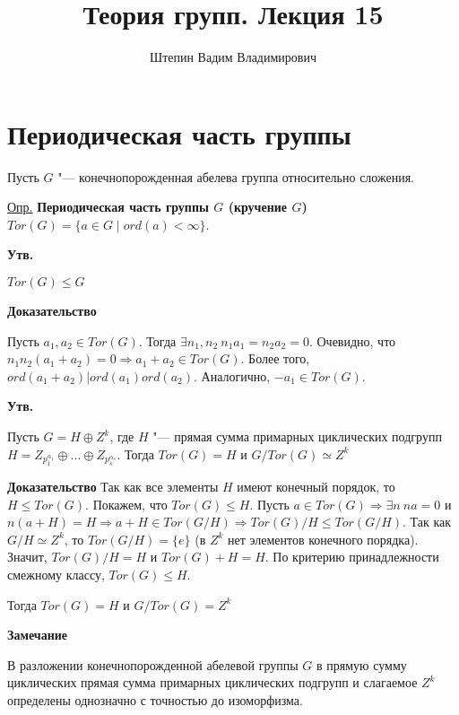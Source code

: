 \documentclass{article}
\title{Теория групп. Лекция 15}
\author{Штепин Вадим Владимирович}
\date{\DTMdate{2019-12-12}}
\begin{document}
\maketitle

\section{Периодическая часть группы}

Пусть $G$ "--- конечнопорожденная абелева группа относительно сложения.

\underline{Опр.} \textbf{Периодическая часть группы $G$ (кручение $G$)} $Tor(G) = \{a \in G \mid ord(a) < \infty\}$.

\vspace{5pt}

\textbf{Утв.}

$Tor(G) \leq G$

\vspace{5pt}

\textbf{Доказательство}

Пусть $a_1, a_2 \in Tor(G)$. Тогда $\exists n_1, n_2 \ n_1a_1 = n_2a_2 = 0$. Очевидно, что $n_1n_2(a_1 + a_2) = 0 \Rightarrow a_1 + a_2 \in Tor(G)$. Более того, $ord(a_1 + a_2) | ord(a_1)ord(a_2)$. Аналогично, $-a_1 \in Tor(G)$.

\vspace{5pt}

\textbf{Утв.}

Пусть $G = H \oplus Z^k$, где $H$ "--- прямая сумма примарных циклических подгрупп $H = Z_{p_1^{\alpha_1}} \oplus ... \oplus Z_{p_s^{\alpha_s}}$. Тогда $Tor(G) = H$ и $G / Tor(G) \simeq Z^k$

\vspace{5pt}

\textbf{Доказательство}
Так как все элементы $H$ имеют конечный порядок, то $H \leq Tor(G)$. Покажем, что $Tor(G) \leq H$. Пусть $a \in Tor(G) \Rightarrow \exists n \ na = 0$ и $n(a + H) = H \Rightarrow a + H \in Tor(G / H) \Rightarrow Tor(G) / H \leq Tor(G / H)$. Так как $G / H \simeq Z^k$, то $Tor(G / H) = \{e\}$ (в $Z^k$ нет элементов конечного порядка). Значит, $Tor(G) / H = H$ и $Tor(G) + H = H$. По критерию принадлежности смежному классу, $Tor(G) \leq H$.

Тогда $Tor(G) = H$ и $G / Tor(G) = Z^k$

\vspace{10pt}

\textbf{Замечание}

В разложении конечнопорожденной абелевой группы $G$ в прямую сумму циклических прямая сумма примарных циклических подгрупп и слагаемое $Z^k$ определены однозначно с точностью до изоморфизма.
\end{document}
